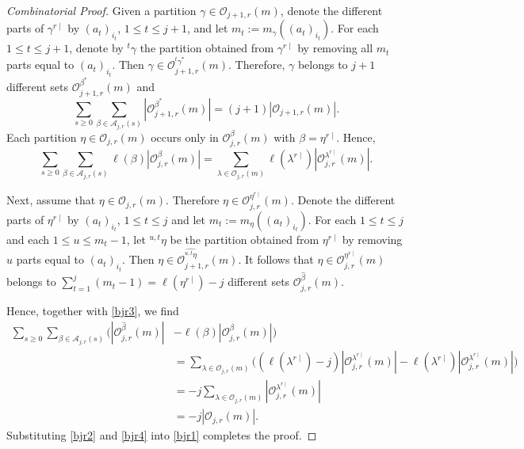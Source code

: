 \documentclass[reqno,12pt]{amsart}
\theoremstyle{definition}
\newcommand{\ds}{\displaystyle}
\begin{document}
\begin{proof}[Combinatorial Proof]
Given a partition $\gamma\in \mathcal O_{j+1,r}(m)$, denote the different parts of $\gamma^{r\mid}$ by $(a_t)_{i_t}$, $1\leq t\leq j+1$, and let $m_t:=m_\gamma((a_t)_{i_t})$. For each $1\leq t\leq j+1$, denote by $^t\gamma$ the partition obtained from $\gamma^{r\mid}$ by removing all $m_t$ parts equal to $(a_t)_{i_t}$. Then $\gamma\in \mathcal O^{^t\gamma^*}_{j+1,r}(m)$. Therefore, $\gamma$ belongs to $j+1$ different sets 
$\mathcal O^{\beta^*}_{j+1,r}(m)$ and
\begin{equation}\label{bjr2}
\sum_{s\geq 0}\sum_{\beta\in \mathcal A_{j,r}(s)}|\mathcal O^{\beta^*}_{j+1,r}(m)|= (j+1)|\mathcal O_{j+1, r}(m)|.
\end{equation}
Each partition $\eta\in \mathcal O_{j,r}(m)$ occurs only in $\mathcal O^{\beta}_{j,r}(m)$ with $\beta=\eta^{r\mid}$. Hence, 
\begin{equation}\label{bjr3}
\sum_{s\geq 0}\sum_{\beta\in \mathcal A_{j,r}(s)}\ell(\beta)|\mathcal O^\beta_{j,r}(m)|= \sum_{\lambda\in \mathcal O_{j,r}(m)}\ell(\lambda^{r\mid})|\mathcal O^{\lambda^{r\mid}}_{j,r}(m)|.
\end{equation}


Next, assume that $\eta\in \mathcal O_{j,r}(m)$. Therefore $\eta\in \mathcal O^{\eta^{r\mid}}_{j,r}(m)$.  Denote the different parts of  $\eta^{r\mid}$ by $(a_t)_{i_t}$, $1\leq t\leq j$ and let $m_t:= m_\eta((a_t)_{i_t})$. For each $1\leq t\leq j$ and each $1\leq u \leq m_t-1$, let $^{u,t}\eta$ be the partition obtained from $\eta^{r\mid}$ by removing $u$ parts equal to $(a_t)_{i_t}$. Then $\eta\in \mathcal O^{\widehat{^{u,t}\eta}}_{j+1,r}(m)$.
It follows that $\eta\in \mathcal O^{\eta^{r\mid}}_{j,r}(m)$ belongs to $\ds\sum_{t=1}^j(m_t-1)=\ell(\eta^{r\mid})-j$ different sets $\mathcal O^{\hat\beta}_{j,r}(m)$. 



Hence, together with \eqref{bjr3}, we find
\begin{align}\label{bjr4}
\sum_{s\geq 0}\sum_{\beta\in \mathcal A_{j,r}(s)}\Big(|\mathcal O^{\hat\beta}_{j,r}(m)|&-\ell(\beta)|\mathcal O^{\beta}_{j,r}(m)|\Big)\nonumber\\
& = \sum_{\lambda\in \mathcal O_{j,r}(m)}\Big((\ell(\lambda^{r\mid})-j)|\mathcal O^{\lambda^{r\mid}}_{j,r}(m)|-\ell(\lambda^{r\mid})|\mathcal O^{\lambda^{r\mid}}_{j,r}(m)|\Big)\nonumber\\ & =  -j\sum_{\lambda\in \mathcal O_{j,r}(m)}|\mathcal O^{\lambda^{r\mid}}_{j,r}(m)|\nonumber\\ 
& = -j|\mathcal O_{j,r}(m)|.
\end{align} 
Substituting \eqref{bjr2} and \eqref{bjr4} into \eqref{bjr1} completes the proof.
\end{proof}
\end{document}
